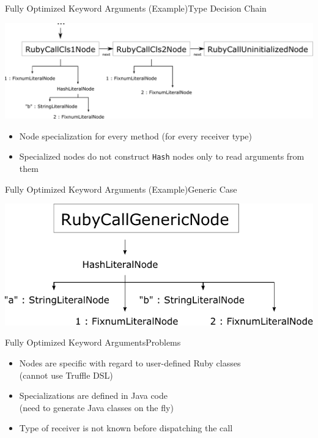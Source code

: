 \documentclass[xcolor=dvipsname,handout]{beamer} %
\begin{document}
\begin{frame}{Fully Optimized Keyword Arguments (Example)}{Type Decision Chain}
\begin{table}
    \centering
    \includegraphics[width=\textwidth]{fully_opt.pdf}
\end{table}

\begin{itemize}
    \item Node specialization for every method (for every receiver type)
    \item Specialized nodes do not construct \lstinline{Hash} nodes only to read arguments from them
\end{itemize}
\end{frame}

\begin{frame}{Fully Optimized Keyword Arguments (Example)}{Generic Case}
\begin{table}
    \centering
    \includegraphics[width=\textwidth]{kwargs_generic.pdf}
\end{table}
\end{frame}

\begin{frame}{Fully Optimized Keyword Arguments}{Problems}
\begin{itemize}
    \item Nodes are specific with regard to user-defined Ruby classes \\ (cannot use Truffle DSL)
    \item Specializations are defined in Java code \\ (need to generate Java classes on the fly)
    \item Type of receiver is not known before dispatching the call
\end{itemize}
\end{frame}
\end{document}
